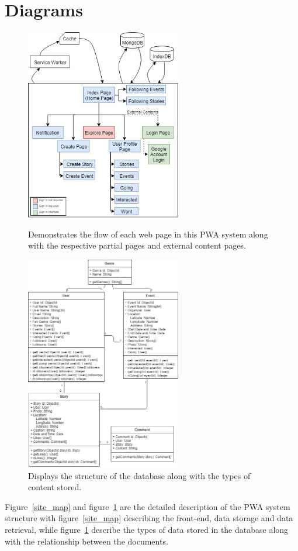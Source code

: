 \documentclass[11pt, a4paper]{article}
\begin{document}
\section{Diagrams}
\begin{figure}[H]
  \begin{center}
    \begin{minipage}[b]{0.4\textwidth}
      \includegraphics[width=6.8cm]{site_map.jpg}
      \caption{Demonstrates the flow of each web page in this PWA system along with the respective partial 
      pages and external content pages.}
      \label{site_map}
    \end{minipage}
    \qquad
    \begin{minipage}[b]{0.4\textwidth}
      \includegraphics[width=6.8cm]{uml.jpg}
      \caption{Displays the structure of the database along with the types of content stored.}
      \label{uml}
    \end{minipage}
  \end{center}
\end{figure}
Figure~\ref{site_map} and figure~\ref{uml} are the detailed description of the PWA system structure with 
figure~\ref{site_map} describing the front-end, data storage and data retrieval, while figure~\ref{uml} 
describe the types of data stored in the database along with the relationship between the documents.
\end{document}
